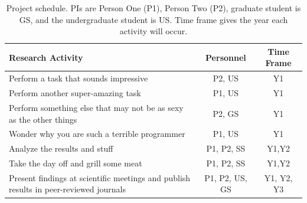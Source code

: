 \begin{table}[H]
\label{table1}
\renewcommand{\arraystretch}{0}
\caption{Project schedule.  PIs are Person One (P1), Person Two (P2), graduate student is GS, and the undergraduate student is US\@. Time frame gives the year each activity will occur.}
\scriptsize
\begin{tabularx}{\textwidth}{Y c c }
\hline
\hline
\textbf{Research Activity} & \textbf{Personnel} & \textbf{Time Frame}\\
\hline
Perform a task that sounds impressive & P2, US & Y1 \T\\
Perform another super-amazing task & P1, US & Y1 \T\\
Perform something else that may not be as sexy as the other things & P2, GS & Y1 \T\\
Wonder why you are such a terrible programmer & P1, US & Y1 \T\\
Analyze the results and stuff & P1, P2, SS & Y1,Y2 \T\\
Take the day off and grill some meat & P1, P2, SS & Y1,Y2 \T\\
Present findings at scientific meetings and publish results in peer-reviewed journals & P1, P2, US, GS & Y1, Y2, Y3\T\B\\
\hline
\hline
\end{tabularx}
\end{table}

\fi
